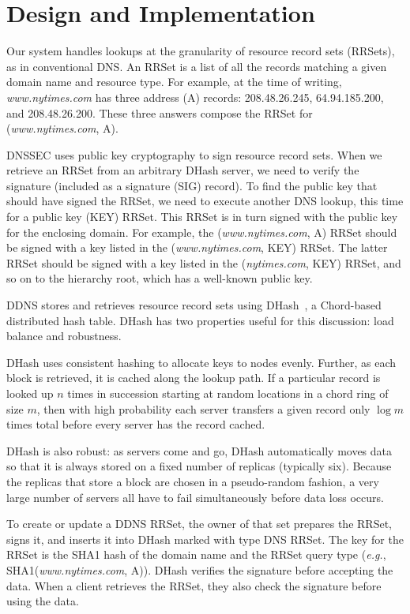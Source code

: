 \section{Design and Implementation}

Our system handles lookups at the granularity of resource record sets (RRSets),
as in conventional DNS.
An RRSet is a list of all the records matching a
given domain name and resource type.
For example, at the time of writing, {\em www.nytimes.com}
has three address (A) records: 208.48.26.245, 64.94.185.200,
and 208.48.26.200.  These three answers compose the RRSet
for ({\em www.nytimes.com}, A).

DNSSEC uses public key cryptography to sign resource record
sets.  When we retrieve an RRSet from an arbitrary
DHash server, we need to verify the signature (included as a 
signature (SIG) record).
To find the public key that should have signed the RRSet,
we need to execute another DNS lookup, 
this time for a public key (KEY) RRSet.
This RRSet is in turn signed with the public key for the
enclosing domain.
For example, the ({\em www.nytimes.com}, A) RRSet should
be signed with a key listed in the ({\em www.nytimes.com}, KEY) RRSet.
The latter RRSet should be signed with a key
listed in the ({\em nytimes.com}, KEY)
RRSet, and so on to the hierarchy root,
which has a well-known public key.

DDNS stores and retrieves resource record sets using
DHash~\cite{cfs:sosp01}, a Chord-based distributed hash table.
DHash has two properties useful for this
discussion: load balance and robustness.

DHash uses consistent hashing to allocate keys to nodes evenly.
Further, as each block is retrieved, it is cached along
the lookup path.
If a particular record is looked up $n$ times in succession
starting at random locations in a chord ring of size $m$, then with high probability
each server transfers a given record only $\log{m}$ times total
before every server has the record cached.

DHash is also robust: as servers come and go, DHash automatically
moves data so that it is always stored on a fixed number of replicas
(typically six).  Because the replicas that store a block are chosen
in a pseudo-random fashion, a very large number of servers all have to
fail simultaneously before data loss occurs. 

To create or update a DDNS RRSet, the owner of that set prepares
the RRSet, signs it, and inserts it into DHash marked with type DNS RRSet.
The key for the RRSet is the SHA1 hash of the domain name and the RRSet query type
({\em e.g.}, SHA1({\em www.nytimes.com}, A)).
DHash verifies the signature before accepting the data.
When a client retrieves the RRSet, they also check the signature before using the data.


